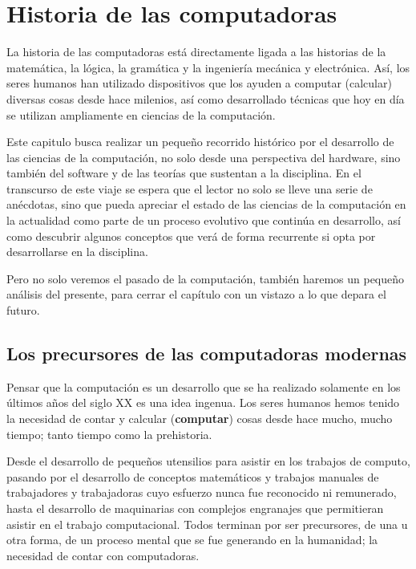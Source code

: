 
\chapter{Historia de las computadoras}

La historia de las computadoras está directamente ligada a las historias de la
matemática, la lógica, la gramática y la ingeniería mecánica y electrónica. Así,
los seres humanos han utilizado dispositivos que los ayuden a computar
(calcular) diversas cosas desde hace milenios, así como desarrollado técnicas
que hoy en día se utilizan ampliamente en ciencias de la computación.

Este capitulo busca realizar un pequeño recorrido histórico por el desarrollo
de las ciencias de la computación, no solo desde una perspectiva del hardware,
sino también del software y de las teorías que sustentan a la disciplina.
En el transcurso de este viaje se espera que el lector no solo se lleve una serie
de anécdotas, sino que pueda apreciar el estado de las ciencias de la computación
en la actualidad como parte de un proceso evolutivo que continúa en desarrollo,
así como descubrir algunos conceptos que verá de forma recurrente si opta por
desarrollarse en la disciplina.

Pero no solo veremos el pasado de la computación, también haremos un pequeño
análisis del presente, para cerrar el capítulo con un vistazo a lo que depara
el futuro.

\section{Los precursores de las computadoras modernas}

Pensar que la computación es un desarrollo que se ha realizado solamente en los
últimos años del siglo XX es una idea ingenua. Los seres humanos hemos tenido
la necesidad de contar y calcular (\textbf{computar}) cosas desde hace mucho,
mucho tiempo; tanto tiempo como la prehistoria.

Desde el desarrollo de pequeños utensilios para asistir en los trabajos de
computo, pasando por el desarrollo de conceptos matemáticos y trabajos manuales
de trabajadores y trabajadoras cuyo esfuerzo nunca fue reconocido ni remunerado,
hasta el desarrollo de maquinarias con complejos engranajes que permitieran
asistir en el trabajo computacional. Todos terminan por ser precursores, de una
u otra forma, de un proceso mental que se fue generando en la humanidad; la
necesidad de contar con computadoras.


